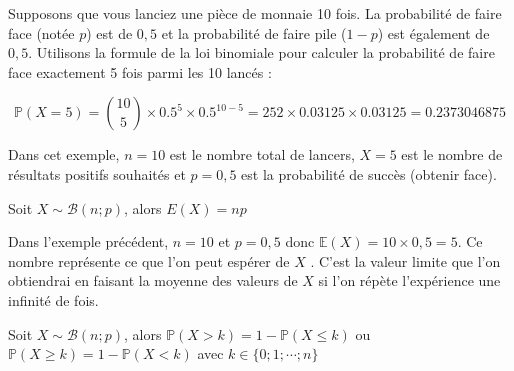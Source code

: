\documentclass[french]{book}
\begin{document}
\begin{exemple}
Supposons que vous lanciez une pièce de monnaie 10 fois. La probabilité de faire face (notée $p$) est de $0,5$ et la probabilité de faire pile ($1-p$) est également de $0,5$. Utilisons la formule de la loi binomiale pour calculer la probabilité de faire face exactement 5 fois parmi les 10 lancés :

$$\mathbb{P}(X=5) = \binom{10}{5} \times 0.5^5 \times 0.5^{10-5} = 252 \times 0.03125 \times 0.03125 = 0.2373046875$$

Dans cet exemple, $n = 10$ est le nombre total de lancers, $X = 5$ est le nombre de résultats positifs souhaités et $p = 0,5$ est la probabilité de succès (obtenir face).
\end{exemple}

\begin{prop}
Soit $X\sim \mathcal{B}(n;p)$, alors $E(X)=np$
\end{prop}

\begin{exemple}
Dans l'exemple précédent, $n = 10$ et $p = 0,5$ donc $\mathbb{E}(X)=10\times 0,5=5$. Ce nombre représente ce que l'on peut espérer de $X$ . C'est la valeur limite que l'on obtiendrai en faisant la moyenne des valeurs de $X$ si l'on répète l'expérience une infinité de fois.
\end{exemple}


\begin{prop}
Soit $X\sim \mathcal{B}(n;p)$, alors $\mathbb{P}(X>k)=1-\mathbb{P}(X\leq k)$ ou $\mathbb{P}(X \geq k)=1-\mathbb{P}(X<k)$ avec $k\in\{0;1;\cdots;n\}$
\end{prop}
\end{document}
